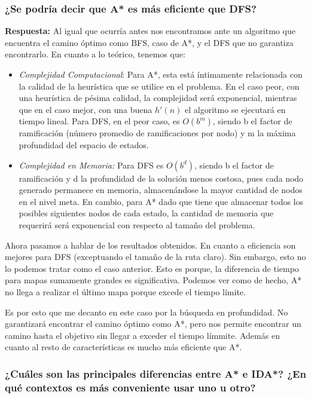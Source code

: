 \documentclass[10pt, a4paper]{article}
\theoremstyle{theorem-style}
\theoremstyle{theorem-style}
\theoremstyle{theorem2-style}
\theoremstyle{definition-style}
\theoremstyle{remark-style}
\theoremstyle{example-style}
\theoremstyle{definition-style}
\theoremstyle{remark-style}
\theoremstyle{remark-style}
\begin{document}
\subsubsection*{¿Se podría decir que A* es más eficiente que DFS?}

\textbf{Respuesta:} Al igual que ocurría antes nos encontramos ante un algoritmo que encuentra el camino óptimo como BFS, caso de A*, y el DFS que no garantiza encontrarlo. En cuanto a lo teórico, tenemos que:

\begin{itemize}
\item \textit{Complejidad Computacional}: Para A*, esta está íntimamente relacionada con la calidad de la heurística que se utilice en el problema. En el caso peor, con una heurística de pésima calidad, la complejidad será exponencial, mientras que en el caso mejor, con una buena $h'(n)$ el algoritmo se ejecutará en tiempo lineal. Para DFS, en el peor caso, es $O(b^m)$, siendo b el factor de ramificación (número promedio de ramificaciones por nodo) y m la máxima profundidad del espacio de estados. 
\item \textit{Complejidad en Memoria: } Para DFS es $O(b^d)$, siendo b el factor de ramificación y d la profundidad de la solución menos costosa, pues cada nodo generado permanece en memoria, almacenándose la mayor cantidad de nodos en el nivel meta. En cambio, para A* dado que tiene que almacenar todos los posibles siguientes nodos de cada estado, la cantidad de memoria que requerirá será exponencial con respecto al tamaño del problema.
\end{itemize} 

Ahora pasamos a hablar de los resultados obtenidos. En cuanto a eficiencia son mejores para DFS (exceptuando el tamaño de la ruta claro). Sin embargo, esto no lo podemos tratar como el caso anterior. Esto es porque, la diferencia de tiempo para mapas sumamente grandes es significativa. Podemos ver como de hecho, A* no llega a realizar el último mapa porque excede el tiempo límite.

Es por esto que me decanto en este caso por la búsqueda en profundidad. No garantizará encontrar el camino óptimo como A*, pero nos permite encontrar un camino hasta el objetivo sin llegar a exceder el tiempo límmite. Además en cuanto al resto de características es mucho más eficiente que A*.


\subsubsection*{¿Cuáles son las principales diferencias entre A* e IDA*? ¿En qué contextos es
más conveniente usar uno u otro?}
\end{document}
